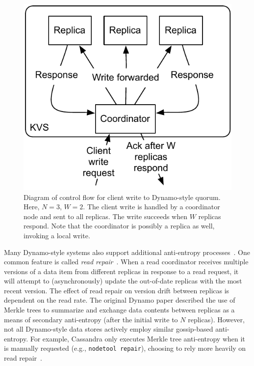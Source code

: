 \documentclass{vldb}
\begin{document}
\begin{figure}
\centering
\includegraphics[width=.8\columnwidth]{figs/dynamo-quorum.pdf}
\caption{Diagram of control flow for client write to Dynamo-style
  quorum.  Here, $N=3$, $W=2$. The client write is handled by a
  coordinator node and sent to all replicas. The write succeeds when
  $W$ replicas respond.  Note that the coordinator is possibly a
  replica as well, invoking a local write.}
\label{fig:dynamo-quorum}
\end{figure}

Many Dynamo-style systems also support additional anti-entropy
processes~\cite{nosql}.  One common feature is called \textit{read
  repair}~\cite{dynamo}.  When a read coordinator receives multiple
versions of a data item from different replicas in response to a read
request, it will attempt to (asynchronously) update the out-of-date
replicas with the most recent version.  The effect of read repair on
version drift between replicas is dependent on the read rate.  The
original Dynamo paper described the use of Merkle trees to summarize
and exchange data contents between replicas as a means of secondary
anti-entropy (after the initial write to $N$ replicas).  However, not
all Dynamo-style data stores actively employ similar gossip-based
anti-entropy.  For example, Cassandra only executes Merkle tree
anti-entropy when it is manually requested (e.g., \texttt{nodetool
  repair}), choosing to rely more heavily on read
repair~\cite{cassandra-merkle}.
\end{document}
